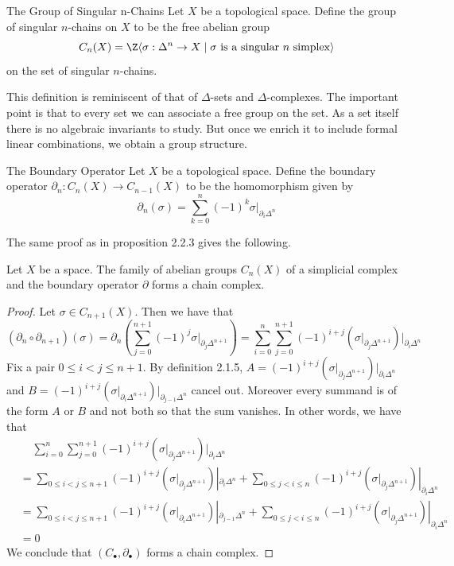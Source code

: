 \documentclass[a4paper]{article}
\begin{document}
\begin{defn}{The Group of Singular n-Chains}{} Let $X$ be a topological space. Define the group of singular $n$-chains on $X$ to be the free abelian group $$C_n(X)=\Z\langle\sigma:\Delta^n\to X\;|\;\sigma\text{ is a singular }n\text{ simplex}\rangle $$ on the set of singular $n$-chains. 
\end{defn}

This definition is reminiscent of that of $\Delta$-sets and $\Delta$-complexes. The important point is that to every set we can associate a free group on the set. As a set itself there is no algebraic invariants to study. But once we enrich it to include formal linear combinations, we obtain a group structure. 

\begin{defn}{The Boundary Operator}{} Let $X$ be a topological space. Define the boundary operator $\partial_n:C_n(X)\to C_{n-1}(X)$ to be the homomorphism given by $$\partial_n(\sigma)=\sum_{k=0}^n(-1)^k\sigma|_{\partial_i\Delta^n}$$
\end{defn}

The same proof as in proposition 2.2.3 gives the following. 

\begin{prp}{}{} Let $X$ be a space. The family of abelian groups $C_n(X)$ of a simplicial complex and the boundary operator $\partial$ forms a chain complex. 
\begin{proof}
Let $\sigma\in C_{n+1}(X)$. Then we have that $$(\partial_n\circ\partial_{n+1})(\sigma)=\partial_n\left(\sum_{j=0}^{n+1}(-1)^j\sigma|_{\partial_j\Delta^{n+1}}\right)=\sum_{i=0}^n\sum_{j=0}^{n+1}(-1)^{i+j}\left(\sigma|_{\partial_j\Delta^{n+1}}\right)|_{\partial_i\Delta^n}$$ Fix a pair $0\leq i<j\leq n+1$. By definition 2.1.5, $A=(-1)^{i+j}\left(\sigma|_{\partial_j\Delta^{n+1}}\right)|_{\partial_i\Delta^n}$ and $B=(-1)^{i+j}\left(\sigma|_{\partial_i\Delta^{n+1}}\right)|_{\partial_{j-1}\Delta^n}$ cancel out. Moreover every summand is of the form $A$ or $B$ and not both so that the sum vanishes. In other words, we have that 
\begin{align*}
&\;\;\;\;\sum_{i=0}^n\sum_{j=0}^{n+1}(-1)^{i+j}\left(\sigma|_{\partial_j\Delta^{n+1}}\right)|_{\partial_i\Delta^n}\\
&=\sum_{0\leq i<j\leq n+1}(-1)^{i+j}\left(\sigma|_{\partial_j\Delta^{n+1}}\right)|_{\partial_i\Delta^n}+\sum_{0\leq j<i\leq n}(-1)^{i+j}\left(\sigma|_{\partial_j\Delta^{n+1}}\right)|_{\partial_i\Delta^n}\\
&=\sum_{0\leq i<j\leq n+1}(-1)^{i+j}\left(\sigma|_{\partial_i\Delta^{n+1}}\right)|_{\partial_{j-1}\Delta^n}+\sum_{0\leq j<i\leq n}(-1)^{i+j}\left(\sigma|_{\partial_j\Delta^{n+1}}\right)|_{\partial_i\Delta^n}\\
&=0
\end{align*}
We conclude that $(C_\bullet,\partial_\bullet)$ forms a chain complex. 
\end{proof}
\end{prp}
\end{document}
